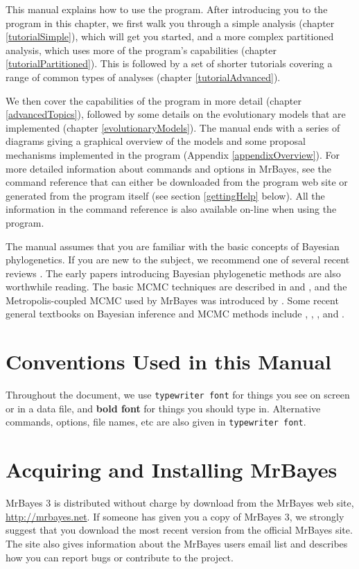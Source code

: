 \documentclass[12pt]{book}
\begin{document}
This manual explains how to use the program. After introducing you to the program in this
chapter, we first walk you through a simple analysis (chapter \ref{tutorialSimple}),
which will get you started, and a more complex partitioned analysis, which uses more of the program's
capabilities (chapter \ref{tutorialPartitioned}). This is followed by a set of shorter tutorials covering
a range of common types of analyses (chapter \ref{tutorialAdvanced}). 

We then cover the capabilities of the program in more detail (chapter \ref{advancedTopics}), followed by
some details on the evolutionary models that are implemented (chapter \ref{evolutionaryModels}). The
manual ends with a series of diagrams giving a graphical overview of the models and some proposal
mechanisms implemented in the program (Appendix \ref{appendixOverview}). For more detailed information
about commands and options in MrBayes, see the command reference that can either be
downloaded from the program web site or generated from the program itself (see section
\ref{gettingHelp} below). All the information in the command reference is also available
on-line when using the program.

The manual assumes that you are familiar with the basic concepts of Bayesian
phylogenetics. If you are new to the subject, we recommend one of several recent reviews
\citep{lewis01, holder03, ronquist10}. The early papers introducing Bayesian phylogenetic
methods \citep{li96, mau96, rannala96, mau97,
larget99, mau99, newton99} are also worthwhile reading. The
basic MCMC techniques are described in \citet{metropolis53} and
\citet{hastings70}, and the Metropolis-coupled MCMC used by MrBayes was introduced by
\citet{geyer91}. Some recent general textbooks on Bayesian inference and MCMC methods
include \citet{gilks96a}, \citet{carlin00}, \citet{gelman03},
and \citet{gamerman06}.


\section{Conventions Used in this Manual}
Throughout the document, we use \texttt{typewriter font} for things you see on screen or in a data
file, and \textbf{bold font} for things you should type in. Alternative commands, options, file names, etc
are also given in \texttt{typewriter font}.

\section{Acquiring and Installing MrBayes}
MrBayes 3 is distributed without charge by download from the MrBayes web site,
\url{http://mrbayes.net}. If someone has given you a copy of MrBayes 3, we strongly suggest
that you download the most recent version from the official MrBayes site. The site also gives 
information about the MrBayes users email list and describes how you can report bugs or 
contribute to the project.
\end{document}

